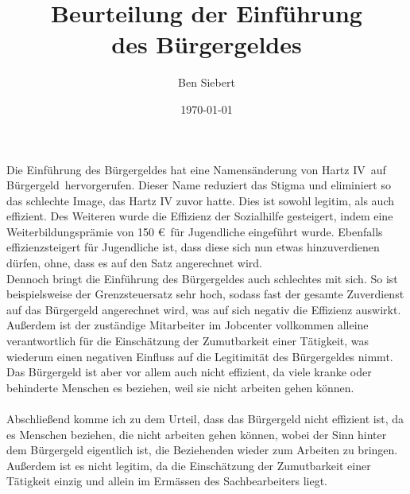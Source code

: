 \documentclass[a4paper]{report}
\begin{document}
	
	\title{Beurteilung der Einführung \\ des Bürgergeldes}
	\author{Ben Siebert}
	\date{\today}
	\maketitle
	\newpage
	
	Die Einführung des Bürgergeldes hat eine Namensänderung von \dq Hartz IV\dq\ auf \dq Bürgergeld\dq\ hervorgerufen.
	Dieser Name reduziert das Stigma und eliminiert so das schlechte Image, das Hartz IV zuvor hatte. Dies ist sowohl legitim, als auch effizient.
	Des Weiteren wurde die Effizienz der Sozialhilfe gesteigert,
	indem eine Weiterbildungsprämie von 150 \euro\ für Jugendliche eingeführt wurde.
	Ebenfalls effizienzsteigert für Jugendliche ist, dass diese sich nun etwas hinzuverdienen dürfen,
	ohne, dass es auf den Satz angerechnet wird. \\
	
	Dennoch bringt die Einführung des Bürgergeldes auch schlechtes mit sich.
	So ist beispielsweise der Grenzsteuersatz sehr hoch, sodass fast der gesamte Zuverdienst auf das Bürgergeld angerechnet wird, was auf sich negativ die Effizienz auswirkt.
	Außerdem ist der zuständige Mitarbeiter im Jobcenter
	vollkommen alleine verantwortlich für die
	Einschätzung der Zumutbarkeit einer Tätigkeit, was wiederum einen negativen Einfluss auf die Legitimität des Bürgergeldes nimmt.
	Das Bürgergeld ist aber vor allem auch nicht effizient, da viele kranke oder behinderte Menschen es beziehen, weil sie nicht arbeiten gehen können.
	\\
	\\
	Abschließend komme ich zu dem Urteil, dass das Bürgergeld nicht effizient ist, da
	es Menschen beziehen, die nicht arbeiten gehen können, wobei der Sinn hinter dem Bürgergeld eigentlich ist, die Beziehenden wieder zum Arbeiten zu bringen.
	Außerdem ist es nicht legitim, da die Einschätzung der Zumutbarkeit einer Tätigkeit einzig und allein im Ermässen des Sachbearbeiters liegt.
	
\end{document}
